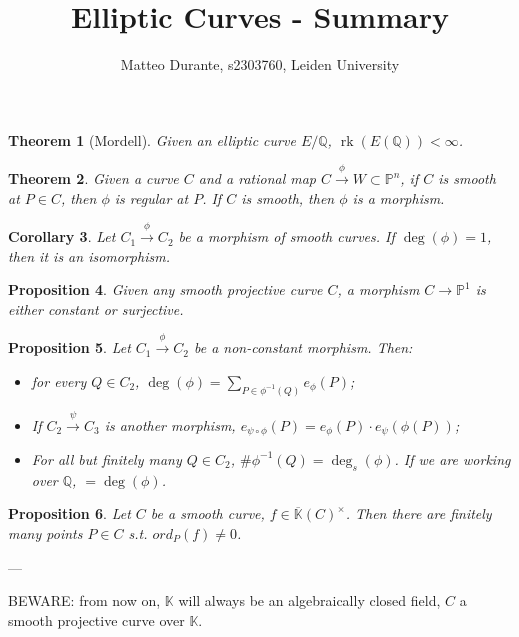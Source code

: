 \documentclass{article}
\newcommand{\numberset}{\mathbb}
\newcommand{\Q}{\numberset{Q}}
\newcommand{\K}{\numberset{K}}
\newcommand{\Ps}{\mathbb{P}}
\DeclareMathOperator{\rk}{rk}
\theoremstyle{plain}
\newtheorem{thm}{Theorem}
\newtheorem{prop}[thm]{Proposition}
\newtheorem{cor}[thm]{Corollary}
\theoremstyle{definition}
\begin{document}
\title{Elliptic Curves - Summary}

\author{Matteo Durante, s2303760, Leiden University}

\maketitle

\begin{thm}[Mordell]
    Given an elliptic curve $E/\Q$, $\rk(E(\Q))<\infty$.
\end{thm}

\begin{thm}
    Given a curve $C$ and a rational map $C\xrightarrow{\phi}W\subset\Ps^n$, if
    $C$ is smooth at $P\in C$, then $\phi$ is regular at $P$. If $C$ is smooth,
    then $\phi$ is a morphism.
\end{thm}

\begin{cor}
    Let $C_1\xrightarrow{\phi}C_2$ be a morphism of smooth curves. If
    $\deg(\phi)=1$, then it is an isomorphism.
\end{cor}

\begin{prop}
    Given any smooth projective curve $C$, a morphism $C\rightarrow\Ps^1$ is
    either constant or surjective.
\end{prop}

\begin{prop}
    Let $C_1\xrightarrow{\phi}C_2$ be a non-constant morphism. Then:
    \begin{itemize}
        \item for every $Q\in C_2$, $\deg(\phi)=\sum_{P\in\phi^{-1}(Q)}e_\phi(P)$;
        \item If $C_2\xrightarrow{\psi}C_3$ is another morphism,
            $e_{\psi\circ\phi}(P)=e_\phi(P)\cdot e_{\psi}(\phi(P))$;
        \item For all but finitely many $Q\in C_2$, 
            $\#\phi^{-1}(Q)=\deg_s(\phi)$. If we are working over $\Q$,
            $=\deg(\phi)$.
    \end{itemize}
\end{prop}

\begin{prop}
    Let $C$ be a smooth curve, $f\in\overline{\K}(C)^\times$. Then there are
    finitely many points $P\in C$ s.t. $ord_P(f)\neq 0$.
\end{prop}

---

BEWARE: from now on, $\K$ will always be an algebraically closed field, $C$ a
smooth projective curve over $\K$.
\end{document}
